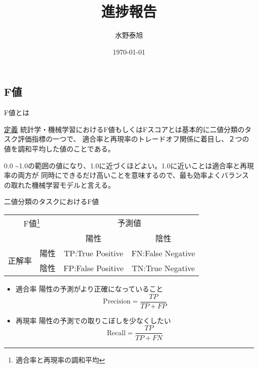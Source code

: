 \documentclass[leno,xcolor=dvipsnames]{beamer}
\title{進捗報告}
\date{\today}
\author{水野泰旭}
\institute{弘前大学理工学部電子情報工学科４年}
\begin{document}
  \maketitle

  \begin{frame}
    \section{F値}
  \end{frame}

  \begin{frame}{F値とは}
    \begin{block}{\href{https://atmarkit.itmedia.co.jp/ait/articles/2210/24/news034.html}{定義}}
      統計学・機械学習におけるF値もしくはFスコアとは基本的に二値分類のタスク評価指標の一つで、
      適合率と再現率のトレードオフ関係に着目し、２つの値を調和平均した値のことである。
    \end{block}
    0.0 \textasciitilde 1.0の範囲の値になり、1.0に近づくほどよい。1.0に近いことは適合率と再現率の両方が
    同時にできるだけ高いことを意味するので、最も効率よくバランスの取れた機械学習モデルと言える。
  \end{frame}

  \begin{frame}{二値分類のタスクにおけるF値}
    \begin{table}[H]
      \centering
      \begin{tabular}{cccc}
        \toprule
        \multicolumn{2}{c}{F値\footnote{適合率と再現率の調和平均}} & \multicolumn{2}{c}{予測値} \\ \cline{3-4}
        & & 陽性　& 陰性 \\
        \midrule
        \multirow{2}{*}{正解率} & 陽性 & TP:True Positive & FN:False Negative \\
        & 陰性 & FP:False Positive & TN:True Negative \\
        \bottomrule
      \end{tabular}
    \end{table}
    \begin{itemize}
      \item 適合率 \mbox{} 陽性の予測がより正確になっていること \[ \mathrm{Precision} = \frac{TP}{TP + FP} \]
      \item 再現率 \mbox{} 陽性の予測での取りこぼしを少なくしたい \[ \mathrm{Recall} = \frac{TP}{TP + FN} \]
    \end{itemize}
  \end{frame}
\end{document}
